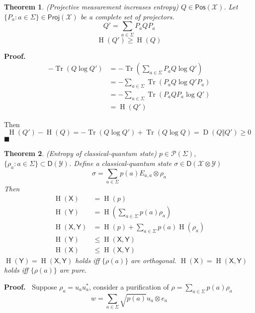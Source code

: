 \documentclass[aps,pra,onecolumn,notitlepage,superscriptaddress]{revtex4-1}
\newcommand{\reg}[1]{\mathsf{#1}}
\newcommand{\spc}[1]{\mathcal{#1}}
\newcommand{\Pos}{\mathsf{Pos}}
\newcommand{\D}{\mathsf{D}}
\newcommand{\Proj}{\mathsf{Proj}}
\newcommand{\Tr}{\operatorname{Tr}}
\newcommand{\op}[1]{\operatorname{#1}}
\newtheorem{theo}{Theorem}
\def\Proof{{\bf Proof.~}}
\def\qed{$\blacksquare$ \newline}
\begin{document}
    \begin{theo}
        (Projective measurement increases entropy) $Q \in \Pos(\spc X)$. Let $\{ P_a : a \in \Sigma \} \in \Proj(\spc X)$ be a complete set of projectors.
        \begin{equation}
            Q' = \sum_{a \in \Sigma} P_a Q P_a
        \end{equation}
        \begin{equation}
            \op H(Q') \geq \op H(Q)
        \end{equation}
    \end{theo}
    \Proof 
    \begin{align*}
        - \Tr(Q \log Q')
        &= -\Tr \left(\sum_{a \in \Sigma} P_a Q \log Q' \right) \\
        &= -\sum_{a \in \Sigma}\Tr  (P_a Q \log Q' P_a) \\
        &= -\sum_{a \in \Sigma}\Tr  (P_a Q P_a \log Q') \\
        &= \op H(Q')
    \end{align*}

    Then
    \begin{equation}
        \op H(Q') - \op H(Q) = - \Tr(Q \log Q') + \Tr(Q \log Q) = \op D(Q \Vert Q') \geq 0
    \end{equation}
    \qed

    \begin{theo}
        (Entropy of classical-quantum state) $p \in \spc P(\Sigma)$, $\{ \rho_a : a \in \Sigma \} \subset \D(\spc Y)$. Define a classical-quantum state $\sigma \in \D(\spc X \otimes \spc Y)$
        \begin{equation}
            \sigma = \sum_{a \in \Sigma} p(a) E_{a,a} \otimes \rho_a
        \end{equation}
        Then
        \begin{align*}
            \op H(\reg X) &= \op H(p) \\
            \op H(\reg Y) &= \op H \left(\sum_{a \in \Sigma} p(a) \rho_a \right) \\
            \op H(\reg X, \reg Y) &= \op H(p) + \sum_{a \in \Sigma} p(a) \op H(\rho_a) \\
            \op H(\reg Y) &\leq \op H(\reg X, \reg Y) \\
            \op H(\reg X) &\leq \op H(\reg X, \reg Y)
        \end{align*}
    $\op H(\reg Y) = \op H(\reg X, \reg Y)$ holds iff $\{\rho(a)\}$ are orthogonal. $\op H(\reg X) = \op H(\reg X, \reg Y)$ holds iff $\{\rho(a)\}$ are pure.
    \end{theo}
    \Proof
    Suppose $\rho_a = u_au_a^*$, consider a purification of $\rho = \sum_{a \in \Sigma} p(a) \rho_a$
    \begin{equation}
        w = \sum_{a \in \Sigma} \sqrt{p(a)} u_a \otimes e_a
    \end{equation}
    
\end{document}
